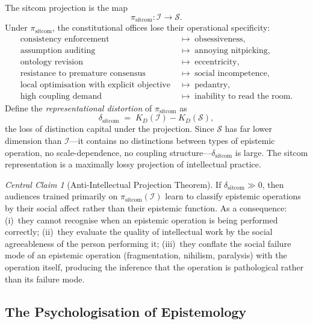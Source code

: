 \documentclass[12pt, letterpaper]{article}
\theoremstyle{remark}
\newtheorem*{claim}{Central Claim}
\begin{document}
The sitcom projection is the map
\begin{equation}
  \pi_{\text{sitcom}} : \mathcal{I} \to \mathcal{S}.
\end{equation}
Under $\pi_{\text{sitcom}}$, the constitutional offices lose their operational
specificity:
\begin{align}
  \text{consistency enforcement} &\;\mapsto\; \text{obsessiveness}, \\
  \text{assumption auditing} &\;\mapsto\; \text{annoying nitpicking}, \\
  \text{ontology revision} &\;\mapsto\; \text{eccentricity}, \\
  \text{resistance to premature consensus} &\;\mapsto\; \text{social incompetence}, \\
  \text{local optimisation with explicit objective} &\;\mapsto\; \text{pedantry}, \\
  \text{high coupling demand} &\;\mapsto\; \text{inability to read the room}.
\end{align}
Define the \emph{representational distortion} of $\pi_{\text{sitcom}}$ as
\begin{equation}
  \delta_{\text{sitcom}}
  \;=\;
  K_D(\mathcal{I}) - K_D(\mathcal{S}),
\end{equation}
the loss of distinction capital under the projection.  Since $\mathcal{S}$
has far lower dimension than $\mathcal{I}$---it contains no distinctions
between types of epistemic operation, no scale-dependence, no coupling
structure---$\delta_{\text{sitcom}}$ is large.  The sitcom representation
is a maximally lossy projection of intellectual practice.

\begin{claim}[Anti-Intellectual Projection Theorem]
If $\delta_{\text{sitcom}} \gg 0$, then audiences trained primarily on
$\pi_{\text{sitcom}}(\mathcal{I})$ learn to classify epistemic operations
by their social affect rather than their epistemic function.  As a
consequence: (i)~they cannot recognise when an epistemic operation is being
performed correctly; (ii)~they evaluate the quality of intellectual work
by the social agreeableness of the person performing it; (iii)~they
conflate the social failure mode of an epistemic operation (fragmentation,
nihilism, paralysis) with the operation itself, producing the inference
that the operation is pathological rather than its failure mode.
\end{claim}

\subsection{The Psychologisation of Epistemology}
\end{document}
